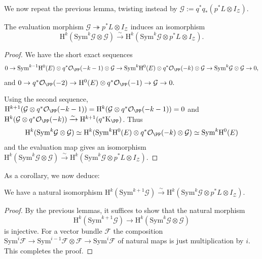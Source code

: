 We now repeat the previous lemma, twisting instead by $\mathcal{G}:=q^*q_*(p^*L \otimes I_{\mathcal{Z}})$.
\begin{lem}
\notready \label{second-twist-lem}
The evaluation morphism $\mathcal{G} \twoheadrightarrow p^*L \otimes I_{\mathcal{Z}}$ induces an isomorphism
$$\mathrm{H}^k(\mathrm{Sym}^{k} \mathcal{G} \otimes \mathcal{G}) \xrightarrow{\sim} \mathrm{H}^k(\mathrm{Sym}^{k} \mathcal{G} \otimes p^*L \otimes I_{\mathcal{Z}}) .$$
\end{lem}
\begin{proof}
We have the short exact sequences
\begin{align*}
0 \to \mathrm{Sym}^{k-1} \mathrm{H}^0(E) \otimes q^*\mathcal{O}_{\PP}(-k-1) \otimes \mathcal{G} \to \mathrm{Sym}^{k}\mathrm{H}^0(E) \otimes q^*\mathcal{O}_{\PP}(-k) \otimes \mathcal{G} \to \mathrm{Sym}^{k}\mathcal{G} \otimes \mathcal{G} \to 0,
\end{align*}
and $0 \to q^*\mathcal{O}_{\PP}(-2) \to \mathrm{H}^0(E) \otimes q^*\mathcal{O}_{\PP}(-1) \to \mathcal{G} \to 0.$

Using the second sequence, $\mathrm{H}^{k+1}(\mathcal{G} \otimes q^*\mathcal{O}_{\PP}(-k-1))=\mathrm{H}^{k}(\mathcal{G} \otimes q^*\mathcal{O}_{\PP}(-k-1))=0$ and $\mathrm{H}^k(\mathcal{G} \otimes q^*\mathcal{O}_{\PP}(-k))\xrightarrow{\sim} \mathrm{H}^{k+1}(q^*\mathrm{K}_{\PP})$. Thus
\begin{align*}
\mathrm{H}^k(\mathrm{Sym}^{k} \mathcal{G} \otimes \mathcal{G}) \simeq \mathrm{H}^k(\mathrm{Sym}^k \mathrm{H}^0(E) \otimes q^*\mathcal{O}_{\PP}(-k)\otimes \mathcal{G}) \simeq \mathrm{Sym}^k\mathrm{H}^0(E)
\end{align*}
and the evaluation map gives an isomorphism $\mathrm{H}^k(\mathrm{Sym}^{k}\mathcal{G} \otimes \mathcal{G}) \xrightarrow{\sim} \mathrm{H}^k(\mathrm{Sym}^{k} \mathcal{G} \otimes p^*L \otimes I_{\mathcal{Z}}).$
\end{proof}
As a corollary, we now deduce:
\begin{prop}
\notready \label{auto-injectivity}
We have a natural isomorphism $\mathrm{H}^k(\mathrm{Sym}^{k+1} \mathcal{G}) \xrightarrow{\sim} \mathrm{H}^k(\mathrm{Sym}^{k} \mathcal{G} \otimes p^*L \otimes I_{\mathcal{Z}}).$
\end{prop}
\begin{proof}
By the previous lemmas, it suffices to show that the natural morphism
$$\mathrm{H}^k(\mathrm{Sym}^{k+1} \mathcal{G}) \to \mathrm{H}^k(\mathrm{Sym}^{k} \mathcal{G} \otimes \mathcal{G})$$
is injective. For a vector bundle $\mathcal{F}$ the composition $\mathrm{Sym}^i \mathcal{F} \to \mathrm{Sym}^{i-1}\mathcal{F} \otimes \mathcal{F} \to \mathrm{Sym}^i \mathcal{F}$
of natural maps is just multiplication by $i$. This completes the proof.
\end{proof}
